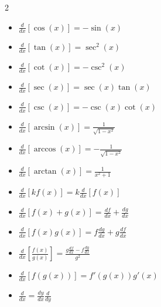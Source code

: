 \begin{itemize}
\begin{multicols}{2}
\begin{itemize}[itemsep=1em]
            \item $\displaystyle \frac d {dx} \left[ \cos(x) \right] = -\sin(x)$
            
            \item $\displaystyle \frac d {dx} \left[ \tan(x) \right] = \sec^2 (x)$
            
            \item $\displaystyle \frac d {dx} \left[ \cot(x) \right] = - \csc^2(x)$
            
            \item $\displaystyle \frac d {dx} \left[ \sec(x) \right] = \sec (x) \tan (x)$
            
            \item $\displaystyle \frac d {dx} \left[ \csc(x) \right] = - \csc (x) \cot (x)$
            
            \item $\displaystyle \frac d {dx} \left[ \arcsin(x) \right] = \frac 1 {\sqrt{1-x^2}}$
            
            \item $\displaystyle \frac d {dx} \left[ \arccos(x) \right] = - \frac 1 {\sqrt{1-x^2}}$
            
            \item $\displaystyle \frac d {dx} \left[ \arctan(x) \right] = \frac 1 {x^2+1}$
            
            \item $\displaystyle \frac d {dx} \left[ k f(x) \right] = k \frac d {dx} \left[ f(x) \right]$
            
            \item $\displaystyle \frac d {dx} \left[ f(x) + g(x) \right] = \frac {df} {dx} + \frac {dg} {dx}$
            
            \item $\displaystyle \frac d {dx} \left[ f(x)g(x) \right] = f \frac {dg} {dx} + g \frac {df} {dx}$
            
            \item $\displaystyle \frac d {dx} \left[ \frac {f(x)} {g(x)} \right] = \frac {g \frac {df} {dx} - f \frac {dg} {dx}} {g^2}$
            
            \item $\displaystyle \frac d {dx} \left[ f \left( g(x) \right) \right] = f' \left( g(x) \right) g' (x)$
            
            \item $\displaystyle \frac d {dx} = \frac {dy} {dx} \frac d {dy}$
            

\end{itemize}
\end{multicols}
\end{itemize}
